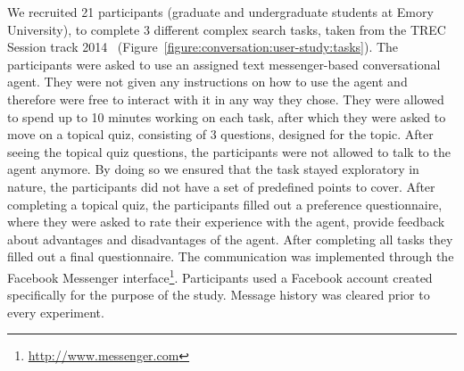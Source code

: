 We recruited 21 participants (graduate and undergraduate students at Emory University), to complete 3 different complex search tasks, taken from the TREC Session track 2014~\cite{sessionTrack2014Overview} (Figure~\ref{figure:conversation:user-study:tasks}).
The participants were asked to use an assigned text messenger-based conversational agent.
They were not given any instructions on how to use the agent and therefore were free to interact with it in any way they chose.
They were allowed to spend up to 10 minutes working on each task, after which they were asked to move on a topical quiz, consisting of 3 questions, designed for the topic.
After seeing the topical quiz questions, the participants were not allowed to talk to the agent anymore.
By doing so we ensured that the task stayed exploratory in nature, \ie the participants did not have a set of predefined points to cover.
After completing a topical quiz, the participants filled out a preference questionnaire, where they were asked to rate their experience with the agent, provide feedback about advantages and disadvantages of the agent.
After completing all tasks they filled out a final questionnaire.
The communication was implemented through the Facebook Messenger interface\footnote{\href{url}{http://www.messenger.com}}.
Participants used a Facebook account created specifically for the purpose of the study.
Message history was cleared prior to every experiment.

